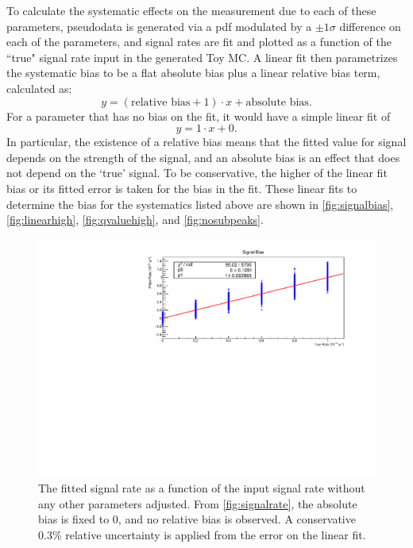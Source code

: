 To calculate the systematic effects on the measurement due to each of these parameters, pseudodata is generated via a pdf modulated by a $\pm1\sigma$ difference on each of the parameters, and signal rates are fit and plotted as a function of the ``true" signal rate input in the generated Toy MC.
A linear fit then parametrizes the systematic bias to be a flat absolute bias plus a linear relative bias term, calculated as:
\begin{equation}
y = (\textrm{relative bias}+1) \cdot x + \textrm{absolute bias}.
\end{equation}
For a parameter that has no bias on the fit, it would have a simple linear fit of 
\begin{equation}
y = 1\cdot x + 0.
\end{equation}
In particular, the existence of a relative bias means that the fitted value for signal depends on the strength of the signal, and an absolute bias is an effect that does not depend on the `true' signal.
To be conservative, the higher of the linear fit bias or its fitted error is taken for the bias in the fit.
These linear fits to determine the bias for the systematics listed above are shown in \autoref{fig:signalbias}, \autoref{fig:linearhigh}, \autoref{fig:qvaluehigh}, and \autoref{fig:nosubpeaks}.
\begin{figure}
\centering
\includegraphics[width=0.7\linewidth]{Figures/Appendix_Figures/SignalBias.pdf}
\caption[The fitted signal rate as a function of the input signal rate without any other parameters adjusted]
{The fitted signal rate as a function of the input signal rate without any other parameters adjusted.
From \autoref{fig:signalrate}, the absolute bias is fixed to 0, and no relative bias is observed.
A conservative 0.3\% relative uncertainty is applied from the error on the linear fit.}
\label{fig:signalbias}
\end{figure}


